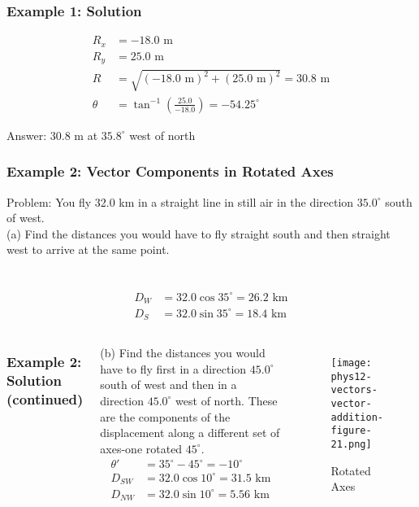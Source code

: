 \documentclass{beamer}
\begin{document}
\begin{frame}
\frametitle{Example 1: Solution}
\begin{align*}
R_x &= -18.0 \text{ m} \\
R_y &= 25.0 \text{ m} \\
R &= \sqrt{(-18.0 \text{ m})^2 + (25.0 \text{ m})^2} = 30.8 \text{ m} \\
\theta &= \tan^{-1} \left( \frac{25.0}{-18.0} \right) = -54.25^\circ
\end{align*}

Answer: 30.8 m at $35.8^\circ$ west of north
\end{frame}

\begin{frame}
\frametitle{Example 2: Vector Components in Rotated Axes}
Problem: You fly 32.0 km in a straight line in still air in the direction $35.0^{\circ}$ south of west. \\
(a) Find the distances you would have to fly straight south and then straight west to arrive at the same point.
\\
\\

\\


\begin{align*}
D_W &= 32.0 \cos 35^\circ = 26.2 \text{ km} \\
D_S &= 32.0 \sin 35^\circ = 18.4 \text{ km}
\end{align*}

\end{frame}

\begin{frame}
\begin{columns}
\frametitle{Example 2: Solution (continued)}
(b) Find the distances you would have to fly first in a direction $45.0^{\circ}$ south of west and then in a direction $45.0^{\circ}$ west of north. These are the components of the displacement along a different set of axes-one rotated $45^{\circ}$.
\begin{align*}
\theta' &= 35^\circ - 45^\circ = -10^\circ \\
D_{SW} &= 32.0 \cos 10^\circ = 31.5 \text{ km} \\
D_{NW} &= 32.0 \sin 10^\circ = 5.56 \text{ km}
\end{align*}

\begin{figure}
\centering
\texttt{[image: phys12-vectors-vector-addition-figure-21.png]}
\caption{Rotated Axes}
\end{figure}
\end{columns}

\end{frame}
\end{document}
